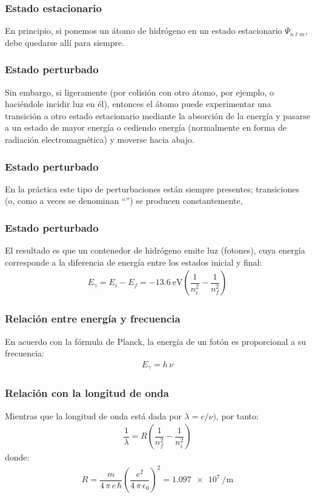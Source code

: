 \documentclass[12pt]{beamer}
\begin{document}
\begin{frame}
\frametitle{Estado estacionario}
En principio, si ponemos un átomo de hidrógeno en un estado estacionario $\Psi_{n \ell m}$, debe quedarse allí para siempre.
\end{frame}
\begin{frame}
\frametitle{Estado perturbado}
Sin embargo, si  ligeramente (por colisión con otro átomo, por ejemplo, o haciéndole incidir  luz en él), \pause entonces el átomo puede experimentar una transición a otro estado estacionario mediante la absorción de la energía y pasarse a un estado de mayor energía o cediendo energía (normalmente en forma de radiación electromagnética) y moverse  hacia abajo.
\end{frame}
\begin{frame}
\frametitle{Estado perturbado}
En la práctica este tipo de perturbaciones están siempre presentes; transiciones (o, como a veces se denominan \enquote{}) se producen constantemente,
\end{frame}
\begin{frame}
\frametitle{Estado perturbado}
El resultado es que un contenedor de hidrógeno emite luz (fotones), cuya energía corresponde a la diferencia de energía entre los estados inicial y final:
\pause
\begin{align}
E_{\gamma} = E_{i} - E_{f} = \SI{-13.6}{\electronvolt} \left( \dfrac{1}{n_{i}^{2}} - \dfrac{1}{n_{f}^{2}} \right)
\label{eq:ecuacion_04_91}
\end{align}
\end{frame}
\begin{frame}
\frametitle{Relación entre energía y frecuencia}
En acuerdo con la fórmula de Planck, la energía de un fotón es proporcional a su frecuencia:
\pause
\begin{align}
E_{\gamma} = h \, \nu
\label{eq:ecuacion_04_92}
\end{align}
\end{frame}
\begin{frame}
\frametitle{Relación con la longitud de onda}
Mientras que la longitud de onda está dada por $\lambda = c / \nu)$, por tanto:
\pause
\begin{align}
\dfrac{1}{\lambda} = R \left( \dfrac{1}{n_{f}^{2}} - \dfrac{1}{n_{i}^{2}} \right)
\label{eq:ecuacion_04_93}
\end{align}
\pause
donde:
\begin{align}
R = \dfrac{m}{4 \, \pi \, c \, \hbar} \left( \dfrac{e^{2}}{4 \, \pi \, \epsilon_{0}} \right)^{2} = \SI{1.097e7}{\per\metre}
\label{eq:ecuacion_04_94}
\end{align}
\end{frame}
\end{document}
